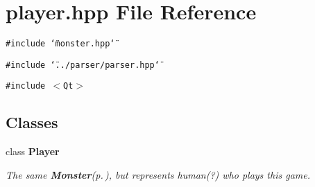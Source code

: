 \section{player.hpp File Reference}
\label{player_8hpp}
{\tt \#include \char`\"{}monster.hpp\char`\"{}}\par
{\tt \#include \char`\"{}../parser/parser.hpp\char`\"{}}\par
{\tt \#include $<$Qt$>$}\par
\subsection*{Classes}
\begin{CompactItemize}
\item 
class {\bf Player}
\begin{CompactList}\small\item\em The same {\bf Monster}{\rm (p.\,\pageref{classMonster})}, but represents human(?) who plays this game. \item\end{CompactList}\end{CompactItemize}
